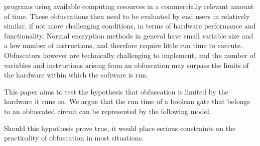 programs using available computing resources in a commercially relevant amount of
time. These obfuscations then need to be evaluated by end users in relatively
similar, if not more challenging conditions, in terms of hardware performance
and functionality. Normal encryption methods in general have small variable size
and a low number of instructions, and therefore require little run time to execute.
Obfuscators however are technically challenging to implement, and the number of
variables and instructions arising from an obfuscation may surpass the limits of
the hardware within which the software is run.
\par
This paper aims to test the hypothesis that obfuscation is limited by the hardware
it runs on. We argue that the run time of a boolean gate that belongs to an
obfuscated circuit can be represented by the following model:
\par
Should this hypothesis prove true, it would place serious constraints
on the practicality of obfuscation in most situations.
